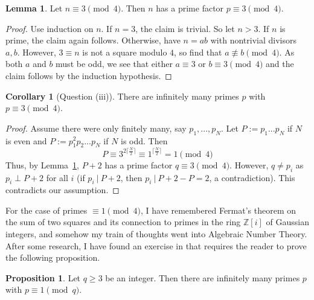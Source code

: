 \documentclass{scrartcl}
\newcommand{\Z}{\mathbb{Z}}
\newcommand{\divides}{\ | \ }
\theoremstyle{definition}
\newtheorem{lemma}[definition]{Lemma}
\newtheorem{proposition}[definition]{Proposition}
\newtheorem{corollary}[definition]{Corollary}
\begin{document}
\begin{lemma}
    \label{prop:prime_factor_3_mod_4}
    Let $n \equiv 3 \pmod 4$. Then $n$ has a prime factor $p \equiv 3 \pmod 4$.
\end{lemma}
\begin{proof}
    Use induction on $n$.
    If $n = 3$, the claim is trivial. 
    So let $n > 3$. If $n$ is prime, the claim again follows.
    Otherwise, have $n = ab$ with nontrivial divisors $a, b$.
    However, $3 \equiv n$ is not a square modulo $4$, so find that $a \not\equiv b \pmod 4$.
    As both $a$ and $b$ must be odd, we see that either $a \equiv 3$ or $b \equiv 3 \pmod 4$ and the claim follows by the induction hypothesis.
\end{proof}
\begin{corollary}[Question (iii)]
    There are infinitely many primes $p$ with $p \equiv 3 \pmod 4$.
\end{corollary}
\begin{proof}
    Assume there were only finitely many, say $p_1, ..., p_N$.
    Let $P := p_1 ... p_N$ if $N$ is even and $P := p_1^2 p_2 ... p_N$ if $N$ is odd.
    Then
    \begin{equation*}
        P \equiv 3^{2 \lceil \frac N 2 \rceil} \equiv 1^{\lceil \frac N 2 \rceil} = 1 \pmod 4
    \end{equation*}
    Thus, by Lemma~\ref{prop:prime_factor_3_mod_4}, $P + 2$ has a prime factor $q \equiv 3 \pmod 4$.
    However, $q \neq p_i$ as $p_i \perp P + 2$ for all $i$ (if $p_i \divides P + 2$, then $p_i \divides P + 2 - P = 2$, a contradiction).
    This contradicts our assumption.
\end{proof}
For the case of primes $\equiv 1 \pmod 4$, I have remembered Fermat's theorem on the sum of two squares and its connection to primes in the ring $\Z[i]$ of Gaussian integers, and somehow my train of thoughts went into Algebraic Number Theory.
After some research, I have found an exercise in \cite[Chapter I, §10]{neukirch} that requires the reader to prove the following proposition.
\begin{proposition}
    \label{prop:primes_1_mod_q}
    Let $q \geq 3$ be an integer.
    Then there are infinitely many primes $p$ with $p \equiv 1 \pmod q$.
\end{proposition}
\end{document}
